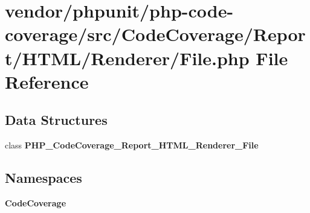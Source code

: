 \section{vendor/phpunit/php-\/code-\/coverage/src/\+Code\+Coverage/\+Report/\+H\+T\+M\+L/\+Renderer/\+File.php File Reference}
\label{phpunit_2php-code-coverage_2src_2_code_coverage_2_report_2_h_t_m_l_2_renderer_2_file_8php}
\subsection*{Data Structures}
\begin{DoxyCompactItemize}
\item 
class {\bf P\+H\+P\+\_\+\+Code\+Coverage\+\_\+\+Report\+\_\+\+H\+T\+M\+L\+\_\+\+Renderer\+\_\+\+File}
\end{DoxyCompactItemize}
\subsection*{Namespaces}
\begin{DoxyCompactItemize}
\item 
 {\bf Code\+Coverage}
\end{DoxyCompactItemize}
